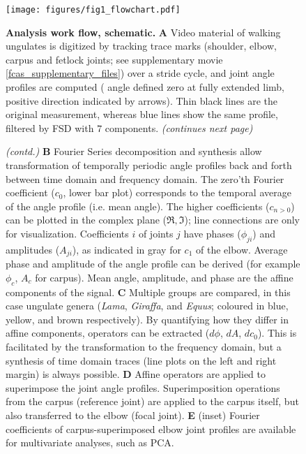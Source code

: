 \begin{figure}[p]
\begin{center}
\texttt{[image: figures/fig1\_flowchart.pdf]}
\end{center}
\caption{\textbf{Analysis work flow, schematic.}
\textbf{A} Video material of walking ungulates is digitized by tracking trace marks (shoulder, elbow, carpus and fetlock joints; see supplementary movie \ref{fcas_supplementary_files}) over a stride cycle, and joint angle profiles are computed ( angle defined zero at fully extended limb, positive direction indicated by arrows). Thin black lines are the original measurement, whereas blue lines show the same profile, filtered by FSD with $7$ components.
\textit{(continues next page)}
  }
\label{fig:workflow}
\end{figure}

\addtocounter{figure}{-1}
\begin{figure}[p]
  \caption{
\textit{(contd.)}
\textbf{B} Fourier Series decomposition and synthesis allow transformation of temporally periodic  angle profiles back and forth between time domain and frequency domain. The zero'th Fourier coefficient ($c_{0}$, lower bar plot) corresponds to the temporal average of the  angle profile (i.e. mean  angle). The higher coefficients ($c_{n>0}$) can be plotted in the complex plane ($\Re, \Im$); line connections are only for visualization. Coefficients $i$ of joints $j$ have phases ($\phi_{ji}$) and amplitudes ($A_{ji}$), as indicated in gray for $c_{1}$ of the elbow. Average phase and amplitude of the  angle profile can be derived (for example $\phi_{c}$, $A_{c}$ for carpus). Mean  angle, amplitude, and phase are the affine components of the signal.
\newline\textbf{C} Multiple groups are compared, in this case ungulate genera (\textit{Lama}, \textit{Giraffa}, and \textit{Equus}; coloured in blue, yellow, and brown respectively). By quantifying how they differ in affine components, operators can be extracted ($d\phi$, $dA$, $dc_{0}$). This is facilitated by the transformation to the frequency domain, but a synthesis of time domain traces (line plots on the left and right margin) is always possible.
\newline \textbf{D} Affine operators are applied to superimpose the joint angle profiles. Superimposition operations from the carpus (reference joint) are applied to the carpus itself, but also transferred to the elbow (focal joint).
\newline\textbf{E} (inset) Fourier coefficients of carpus-superimposed elbow joint profiles are available for multivariate analyses, such as PCA.
  }
\end{figure}




